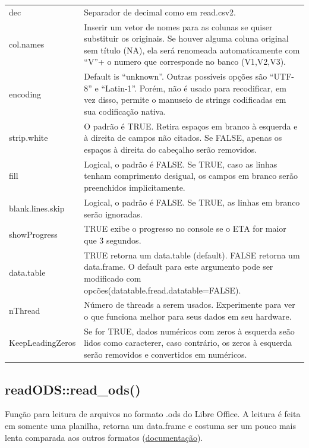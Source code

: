 \documentclass[
]{book}
\theoremstyle{definition}
\theoremstyle{definition}
\theoremstyle{definition}
\theoremstyle{definition}
\theoremstyle{remark}
\begin{document}
\begin{longtable}[]{@{}
  >{\raggedright\arraybackslash}p{}
  >{\raggedright\arraybackslash}p{}@{}}
dec & Separador de decimal como em read.csv2. \\
col.names & Inserir um vetor de nomes para as colunas se quiser substituir os originais. Se houver alguma coluna original sem título (NA), ela será renomeada automaticamente com ``V''+ o numero que corresponde no banco (V1,V2,V3). \\
encoding & Default is ``unknown''. Outras possíveis opções são ``UTF-8'' e ``Latin-1''. Porém, não é usado para recodificar, em vez disso, permite o manuseio de strings codificadas em sua codificação nativa. \\
strip.white & O padrão é TRUE. Retira espaços em branco à esquerda e à direita de campos não citados. Se FALSE, apenas os espaços à direita do cabeçalho serão removidos. \\
fill & Logical, o padrão é FALSE. Se TRUE, caso as linhas tenham comprimento desigual, os campos em branco serão preenchidos implicitamente. \\
blank.lines.skip & Logical, o padrão é FALSE. Se TRUE, as linhas em branco serão ignoradas. \\
showProgress & TRUE exibe o progresso no console se o ETA for maior que 3 segundos. \\
data.table & TRUE retorna um data.table (default). FALSE retorna um data.frame. O default para este argumento pode ser modificado com opcões(datatable.fread.datatable=FALSE). \\
nThread & Número de threads a serem usados. Experimente para ver o que funciona melhor para seus dados em seu hardware. \\
KeepLeadingZeros & Se for TRUE, dados numéricos com zeros à esquerda seão lidos como caracterer, caso contrário, os zeros à esquerda serão removidos e convertidos em numéricos. \\
\end{longtable}

\hypertarget{readodsread_ods}{%
\subsection{readODS::read\_ods()}\label{readodsread_ods}}

Função para leitura de arquivos no formato .ods do Libre Office. A leitura é feita em somente uma planilha, retorna um data.frame e costuma ser um pouco mais lenta comparada aos outros formatos (\href{https://www.rdocumentation.org/packages/readODS/versions/1.7.0/topics/read_ods}{documentação}).
\end{document}
